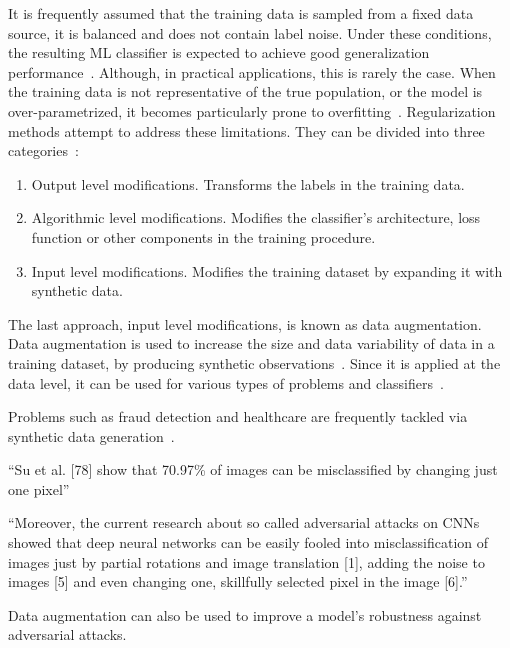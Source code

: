 \documentclass[parskip=full]{scrartcl}
\begin{document}
It is frequently assumed that the training data is sampled from a fixed data
source, it is balanced and does not contain label noise. Under these
conditions, the resulting ML classifier is expected to achieve good
generalization performance~\cite{benning2018modern}. Although, in practical
applications, this is rarely the case. When the training data is not
representative of the true population, or the model is over-parametrized, it
becomes particularly prone to overfitting~\cite{Bartlett2021}. Regularization
methods attempt to address these limitations. They can be divided into three
categories~\cite{santos2022avoiding}:

\begin{enumerate}
    \item Output level modifications. Transforms the labels in the training
        data.
    \item Algorithmic level modifications. Modifies the classifier's
        architecture, loss function or other components in the training
        procedure.
    \item Input level modifications. Modifies the training dataset by expanding it
        with synthetic data.
\end{enumerate}

The last approach, input level modifications, is known as data augmentation.
Data augmentation is used to increase the size and data variability of data in
a training dataset, by producing synthetic observations~\cite{Van2001,
Wong2016}. Since it is applied at the data level, it can be used for various
types of problems and classifiers~\cite{Behpour2019}. 

Problems such as fraud detection and healthcare are frequently tackled via
synthetic data generation~\cite{ekbatani2017synthetic}.

``Su et al. [78] show that 70.97\% of images can be misclassified by changing
just one pixel'' \citet{shorten2019survey}

``Moreover, the current research about so called adversarial attacks on CNNs
showed that deep neural networks can be easily fooled into misclassification
of images just by partial rotations and image translation [1], adding the
noise to images [5] and even changing one, skillfully selected pixel in the
image [6].'' \citet{mikolajczyk2018data}

Data augmentation can also be used to improve a model's robustness against
adversarial attacks. 

\end{document}
